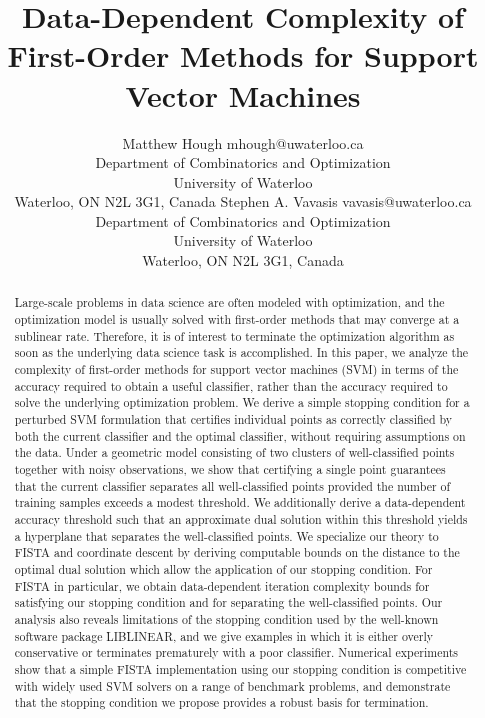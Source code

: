 \documentclass[twoside,11pt]{article}
\begin{document}
\title{Data-Dependent Complexity of First-Order Methods for Support Vector Machines}

\author{\name Matthew Hough \email mhough@uwaterloo.ca \\
       \addr Department of Combinatorics and Optimization\\
       University of Waterloo\\
       Waterloo, ON N2L 3G1, Canada
       \AND
       \name Stephen A. Vavasis \email vavasis@uwaterloo.ca \\
       \addr Department of Combinatorics and Optimization\\
       University of Waterloo\\
       Waterloo, ON N2L 3G1, Canada}
       

\maketitle

\begin{abstract}%
    Large-scale problems in data science are often modeled with optimization, and the optimization model is usually solved with first-order methods that may converge at a sublinear rate. Therefore, it is of interest to terminate the optimization algorithm as soon as the underlying data science task is accomplished. In this paper, we analyze the complexity of first-order methods for support vector machines (SVM) in terms of the accuracy required to obtain a useful classifier, rather than the accuracy required to solve the underlying optimization problem. We derive a simple stopping condition for a perturbed SVM formulation that certifies individual points as correctly classified by both the current classifier and the optimal classifier, without requiring assumptions on the data. Under a geometric model consisting of two clusters of well-classified points together with noisy observations, we show that certifying a single point guarantees that the current classifier separates all well-classified points provided the number of training samples exceeds a modest threshold. We additionally derive a data-dependent accuracy threshold such that an approximate dual solution within this threshold yields a hyperplane that separates the well-classified points. We specialize our theory to FISTA and coordinate descent by deriving computable bounds on the distance to the optimal dual solution which allow the application of our stopping condition. For FISTA in particular, we obtain data-dependent iteration complexity bounds for satisfying our stopping condition and for separating the well-classified points. Our analysis also reveals limitations of the stopping condition used by the well-known software package LIBLINEAR, and we give examples in which it is either overly conservative or terminates prematurely with a poor classifier. Numerical experiments show that a simple FISTA implementation using our stopping condition is competitive with widely used SVM solvers on a range of benchmark problems, and demonstrate that the stopping condition we propose provides a robust basis for termination.
\end{abstract}
\end{document}

